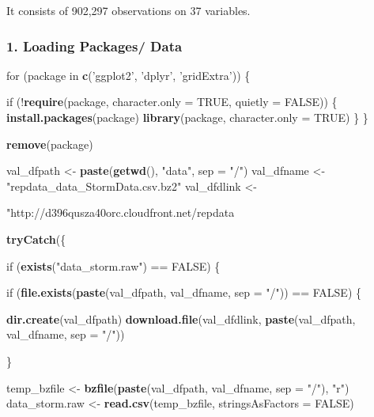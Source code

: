 \documentclass[]{article}
\newenvironment{Shaded}{\begin{snugshade}}{\end{snugshade}}
\newcommand{\KeywordTok}[1]{\textcolor[rgb]{0.13,0.29,0.53}{\textbf{{#1}}}}
\newcommand{\DataTypeTok}[1]{\textcolor[rgb]{0.13,0.29,0.53}{{#1}}}
\newcommand{\StringTok}[1]{\textcolor[rgb]{0.31,0.60,0.02}{{#1}}}
\newcommand{\OtherTok}[1]{\textcolor[rgb]{0.56,0.35,0.01}{{#1}}}
\newcommand{\NormalTok}[1]{{#1}}
\begin{document}
It consists of 902,297 observations on 37 variables.

\subsubsection{1. Loading Packages/ Data}\label{loading-packages-data}

\begin{Shaded}
\begin{Highlighting}[]
\NormalTok{for (package in }\KeywordTok{c}\NormalTok{(}\StringTok{'ggplot2'}\NormalTok{, }\StringTok{'dplyr'}\NormalTok{, }\StringTok{'gridExtra'}\NormalTok{)) \{}
 
    \NormalTok{if (!}\KeywordTok{require}\NormalTok{(package, }\DataTypeTok{character.only =} \OtherTok{TRUE}\NormalTok{, }\DataTypeTok{quietly =} \OtherTok{FALSE}\NormalTok{)) \{}
        \KeywordTok{install.packages}\NormalTok{(package)}
        \KeywordTok{library}\NormalTok{(package, }\DataTypeTok{character.only =} \OtherTok{TRUE}\NormalTok{)}
    \NormalTok{\}}
\NormalTok{\}}

\KeywordTok{remove}\NormalTok{(package)}

\NormalTok{val_dfpath <-}\StringTok{ }\KeywordTok{paste}\NormalTok{(}\KeywordTok{getwd}\NormalTok{(), }\StringTok{"data"}\NormalTok{, }\DataTypeTok{sep =} \StringTok{"/"}\NormalTok{)}
\NormalTok{val_dfname <-}\StringTok{ "repdata_data_StormData.csv.bz2"}
\NormalTok{val_dfdlink <-}\StringTok{ "http://d396qusza40orc.cloudfront.net/repdata%

\KeywordTok{tryCatch}\NormalTok{(\{}

  \NormalTok{if (}\KeywordTok{exists}\NormalTok{(}\StringTok{"data_storm.raw"}\NormalTok{) ==}\StringTok{ }\OtherTok{FALSE}\NormalTok{) \{}
 
    \NormalTok{if (}\KeywordTok{file.exists}\NormalTok{(}\KeywordTok{paste}\NormalTok{(val_dfpath, val_dfname, }\DataTypeTok{sep =} \StringTok{"/"}\NormalTok{)) ==}\StringTok{ }\OtherTok{FALSE}\NormalTok{) \{}
       
      \KeywordTok{dir.create}\NormalTok{(val_dfpath)}
      \KeywordTok{download.file}\NormalTok{(val_dfdlink, }\KeywordTok{paste}\NormalTok{(val_dfpath, val_dfname, }\DataTypeTok{sep =} \StringTok{"/"}\NormalTok{))}
       
    \NormalTok{\}}
     
    \NormalTok{temp_bzfile <-}\StringTok{ }\KeywordTok{bzfile}\NormalTok{(}\KeywordTok{paste}\NormalTok{(val_dfpath, val_dfname, }\DataTypeTok{sep =} \StringTok{"/"}\NormalTok{), }\StringTok{"r"}\NormalTok{)}
    \NormalTok{data_storm.raw <-}\StringTok{ }\KeywordTok{read.csv}\NormalTok{(temp_bzfile, }\DataTypeTok{stringsAsFactors =} \OtherTok{FALSE}\NormalTok{)}
 
}
\end{Highlighting}
\end{Shaded}
\end{document}
